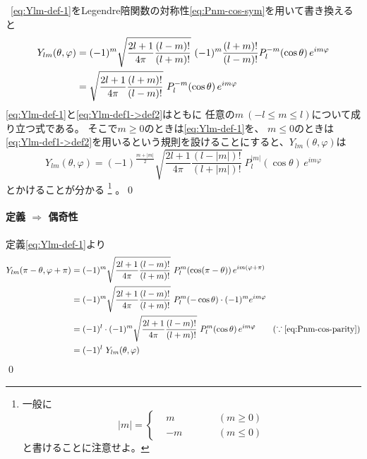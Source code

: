 \documentclass[../main/main]{subfiles}
\begin{document}
\ 
\eqref{eq:Ylm-def-1}をLegendre陪関数の対称性\eqref{eq:Pnm-cos-sym}を用いて書き換えると
\begin{align}
  Y_{lm} (\theta, \varphi)
	&= (-1)^m \sqrt{\frac{2l+1}{4\pi} \frac{(l-m)!}{(l+m)!}} 
		\ (-1)^m\frac{(l+m)!}{(l-m)!} P_l^{-m}(\cos\theta) \, e^{im\varphi} \notag\\
	&= \sqrt{\frac{2l+1}{4\pi} \frac{(l+m)!}{(l-m)!}} 
		\ P_l^{-m}(\cos\theta) \, e^{im\varphi} \label{eq:Ylm-def1->def2}
\end{align}
\eqref{eq:Ylm-def-1}と\eqref{eq:Ylm-def1->def2}はともに
任意の$m \ (-l \leq m \leq l)$について成り立つ式である。
そこで$m \geq 0$のときは\eqref{eq:Ylm-def-1}を、
$m \leq 0$のときは\eqref{eq:Ylm-def1->def2}を用いるという規則を設けることにすると、$Y_{lm}(\theta, \varphi)$は
\begin{equation*}
 Y_{lm}(\theta, \varphi) 
	= (-1)^{\frac{m+|m|}{2}} \sqrt{\frac{2l+1}{4\pi} \frac{(l-|m|)!}{(l+|m|)!}} 
		\ P_l^{|m|}(\cos\theta) \, e^{im\varphi}
\end{equation*}
とかけることが分かる
\footnote{
一般に
\begin{equation*}
  |m| = \left\{
  \begin{alignedat}{2}
    &m &\qquad	& (m\geq 0) \\
    &-m & 		& (m \leq 0)	
  \end{alignedat}
  \right.
\end{equation*}
と書けることに注意せよ。
}
。\qed


\paragraph{定義 $\Longrightarrow$ 偶奇性}
定義\eqref{eq:Ylm-def-1}より
\begin{align*}
  Y_{lm}(\pi-\theta, \varphi+\pi) 
	&= (-1)^m \sqrt{\frac{2l+1}{4\pi} \frac{(l-m)!}{(l+m)!}} 
		\ P_l^m(\cos(\pi-\theta)) \, e^{im(\varphi+\pi)} \notag\\
	&= (-1)^m \sqrt{\frac{2l+1}{4\pi} \frac{(l-m)!}{(l+m)!}} 
		\ P_l^m(-\cos\theta) \cdot (-1)^m e^{im\varphi} \notag\\
	&=  (-1)^l \cdot (-1)^m \sqrt{\frac{2l+1}{4\pi} \frac{(l-m)!}{(l+m)!}} 
		\ P_l^m(\cos\theta) \, e^{im\varphi} \qquad (\since \eqref{eq:Pnm-cos-parity})\notag\\
	&= (-1)^l \ Y_{lm} (\theta, \varphi)
\end{align*}\qed
\end{document}
